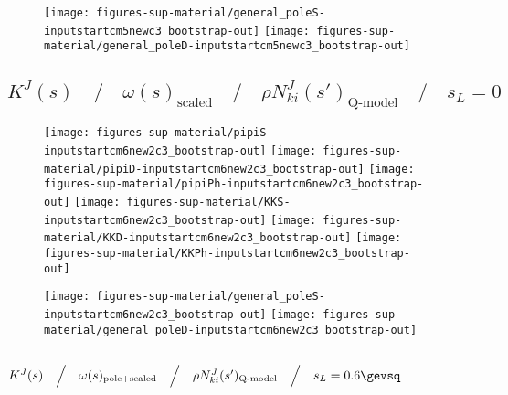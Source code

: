 \begin{figure}[h]
\centering\texttt{[image: figures-sup-material/general\_poleS-inputstartcm5newc3\_bootstrap-out]} \texttt{[image: figures-sup-material/general\_poleD-inputstartcm5newc3\_bootstrap-out]}
\end{figure}



\clearpage

\subsection{$K^J(s) \quad\Big/\quad \omega(s)_\text{scaled} \quad\Big/\quad \rho N^J_{ki}(s')_\text{Q-model} \quad\Big/\quad s_L = 0$}
\label{subsec:inputstartcm6new2c3_bootstrap-out}






\begin{figure}[h]
\centering\texttt{[image: figures-sup-material/pipiS-inputstartcm6new2c3\_bootstrap-out]} \texttt{[image: figures-sup-material/pipiD-inputstartcm6new2c3\_bootstrap-out]} \texttt{[image: figures-sup-material/pipiPh-inputstartcm6new2c3\_bootstrap-out]}
\texttt{[image: figures-sup-material/KKS-inputstartcm6new2c3\_bootstrap-out]} \texttt{[image: figures-sup-material/KKD-inputstartcm6new2c3\_bootstrap-out]} \texttt{[image: figures-sup-material/KKPh-inputstartcm6new2c3\_bootstrap-out]}
\end{figure}

\begin{figure}[h]
\centering\texttt{[image: figures-sup-material/general\_poleS-inputstartcm6new2c3\_bootstrap-out]} \texttt{[image: figures-sup-material/general\_poleD-inputstartcm6new2c3\_bootstrap-out]}
\end{figure}



\clearpage

\subsection{$K^J(s) \quad\Big/\quad \omega(s)_\text{pole+scaled} \quad\Big/\quad \rho N^J_{ki}(s')_\text{Q-model} \quad\Big/\quad s_L = 0.6\gevsq$}
\label{subsec:inputstartcmnew2c3_bootstrap-out}


